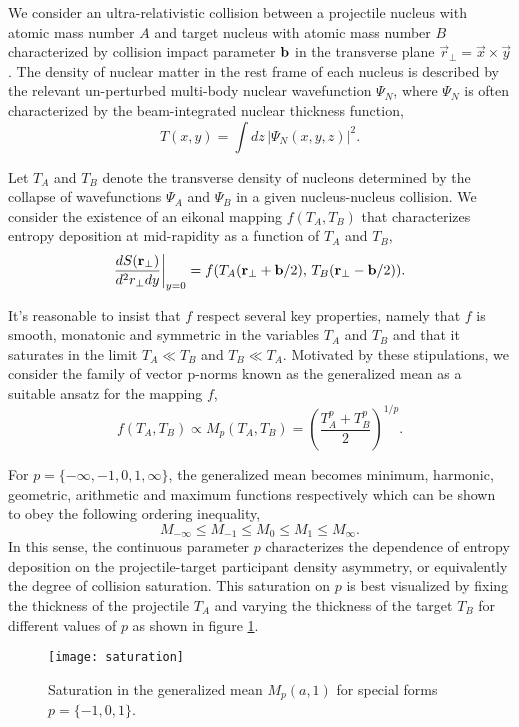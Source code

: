 \documentclass[aps,prl,reprint,amsmath,nofootinbib]{revtex4-1}
\begin{document}
We consider an ultra-relativistic collision between a projectile nucleus with atomic mass number $A$ and target nucleus with atomic mass number $B$ characterized 
by collision impact parameter ${\bf b}$ in the transverse plane $\vec{r}_\perp = \vec{x} \times \vec{y}$. The density of nuclear matter in the rest frame of each 
nucleus is described by the relevant un-perturbed multi-body nuclear wavefunction $\Psi_N$, where $\Psi_N$ is often characterized by the beam-integrated 
nuclear thickness function,
\begin{equation}
 T(x,y) = \int dz\, \left|\Psi_N(x,y,z) \right|^2. 
\end{equation}

Let $T_A$ and $T_B$ denote the transverse density of nucleons determined by the collapse of wavefunctions $\Psi_A$ and $\Psi_B$ in a given nucleus-nucleus 
collision. We consider the existence of an eikonal mapping $f(T_A,T_B)$ that characterizes entropy deposition at mid-rapidity as a function of $T_A$ and $T_B$,
\begin{equation}
  \label{ansatz}
  \frac{dS({\bf r}_\perp)}{d^2r_\perp dy} \biggr \rvert_{y=0}  = f(T_A({\bf r}_\perp + {\bf b}/2),\,T_B({\bf r}_\perp - {\bf b}/2)).
\end{equation}

It's reasonable to insist that $f$ respect several key properties, namely that $f$ is smooth, monatonic and symmetric in the variables $T_A$ and 
$T_B$ and that it saturates in the limit $T_A \ll T_B$ and $T_B \ll T_A$. Motivated by these stipulations, we consider the family of vector p-norms 
known as the generalized mean as a suitable ansatz for the mapping $f$,
\begin{equation}
 \label{generalized mean ansatz}
 f(T_A, T_B) \propto M_p(T_A,T_B) = \left( \frac{T_A^p + T_B^p}{2} \right)^{1/p}.
\end{equation}

For $p = \{-\infty,-1,0,1,\infty\}$, the generalized mean becomes minimum, harmonic, geometric, arithmetic and maximum functions respectively which can be shown
to obey the following ordering inequality, 
\begin{equation}
 M_{-\infty} \le M_{-1} \le M_{0} \le M_{1} \le M_{\infty}.
\end{equation}
In this sense, the continuous parameter $p$ characterizes the dependence of entropy deposition on the projectile-target participant density asymmetry, or equivalently 
the degree of collision saturation. This saturation on $p$ is best visualized by fixing the thickness of the projectile $T_A$ and varying the thickness of the target 
$T_B$ for different values of $p$ as shown in figure \ref{saturation}.
\begin{figure}[b]
 \texttt{[image: saturation]}
 \caption{\label{saturation}Saturation in the generalized mean $M_p(a, 1)$ for special forms $p=\{-1, 0, 1\}$.}
\end{figure}
\end{document}
